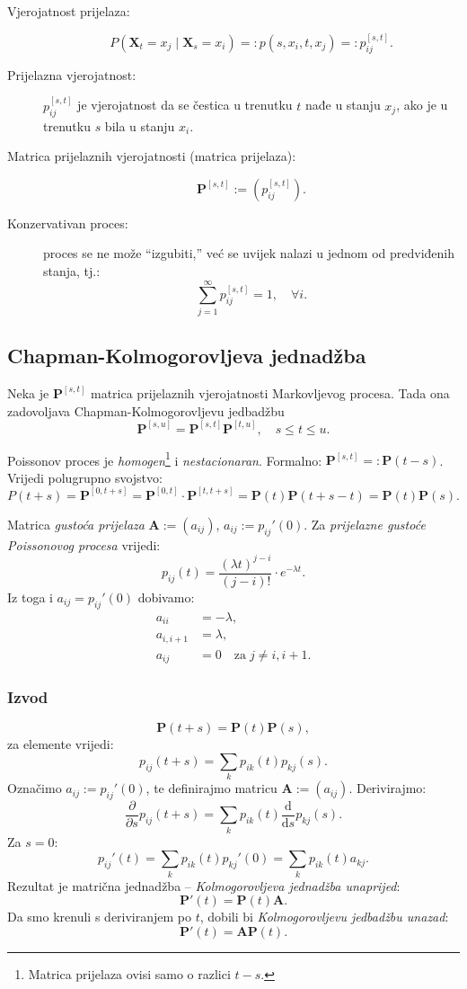 \documentclass[12pt,english]{article}
\newcommand{\X}{\mathbf X}
\newcommand{\A}{\mathbf A}
\newcommand{\MP}{\mathbf P}
\newcommand{\vertS}{\; \vert \;}
\begin{document}
\begin{description}
  \item[Vjerojatnost prijelaza:]
  $$P(\X_t=x_j \vertS \X_s = x_i)=: p(s,x_i,t,x_j) =: p_{ij}^{[s,t]}.$$
  \item[Prijelazna vjerojatnost:] $p_{ij}^{[s,t]}$ je vjerojatnost da se čestica u trenutku $t$ nađe u stanju $x_j$, ako je u trenutku $s$ bila u stanju $x_i$.
  \item[Matrica prijelaznih vjerojatnosti (matrica prijelaza):]
  $$\MP^{[s,t]} := \left(p_{ij}^{[s,t]}\right).$$
  \item[Konzervativan proces:] proces se ne može ``izgubiti,'' već se uvijek nalazi u jednom od predviđenih stanja, tj.:
  $$\sum\limits_{j=1}^\infty p_{ij}^{[s,t]} = 1, \quad \forall i.$$
\end{description}

\subsection{Chapman-Kolmogorovljeva jednadžba}
Neka je $\MP^{[s,t]}$ matrica prijelaznih vjerojatnosti Markovljevog procesa. Tada ona zadovoljava Chapman-Kolmogorovljevu jedbadžbu
$$\MP^{[s,u]} = \MP^{[s,t]}\MP^{[t,u]},\quad s \leq t \leq u.$$

\noindent Poissonov proces je \emph{homogen}\footnote{Matrica prijelaza ovisi samo o razlici $t-s$.} i \emph{nestacionaran}. Formalno: $\MP^{[s,t]} =: \MP(t-s)$. Vrijedi polugrupno svojstvo:
$$P(t+s) = \MP^{[0,t+s]}=\MP^{[0,t]}\cdot \MP^{[t,t+s]}=\MP(t)\MP(t+s-t)=\MP(t)\MP(s).$$

\noindent Matrica \emph{gustoća prijelaza} $\A := (a_{ij})$, $a_{ij}:=p_{ij}'(0)$. Za \emph{prijelazne gustoće Poissonovog procesa} vrijedi:
$$p_{ij}(t)=\frac{(\lambda t)^{j-i}}{(j-i)!}\cdot e^{-\lambda t}.$$
Iz toga i $a_{ij} = p_{ij}'(0)$ dobivamo:
\begin{align}
a_{ii} &= -\lambda, \nonumber \\
a_{i,i+1} &= \lambda, \nonumber \\
a_{ij} &= 0\quad \text{za}\; j\neq i, i+1. \nonumber
\end{align}


\subsubsection{Izvod}
$$\MP(t+s)=\MP(t)\MP(s),$$
za elemente vrijedi:
$$p_{ij}(t+s) = \sum\limits_k p_{ik}(t)p_{kj}(s).$$
Označimo $a_{ij}:=p_{ij}'(0)$, te definirajmo matricu $\A := (a_{ij})$. Derivirajmo:
$$\frac{\partial}{\partial s}p_{ij}(t+s) = \sum\limits_k p_{ik}(t)\frac{\mathrm d}{\mathrm ds}p_{kj}(s).$$
Za $s=0$:
$$p_{ij}'(t)=\sum\limits_k p_{ik}(t)p_{kj}'(0)=\sum\limits_k p_{ik}(t)a_{kj}.$$
Rezultat je matrična jednadžba -- \emph{Kolmogorovljeva jednadžba unaprijed}:
$$\MP'(t)=\MP(t)\A.$$
Da smo krenuli s deriviranjem po $t$, dobili bi \emph{Kolmogorovljevu jedbadžbu unazad}:
$$\MP'(t)=\A\MP(t).$$
\end{document}
